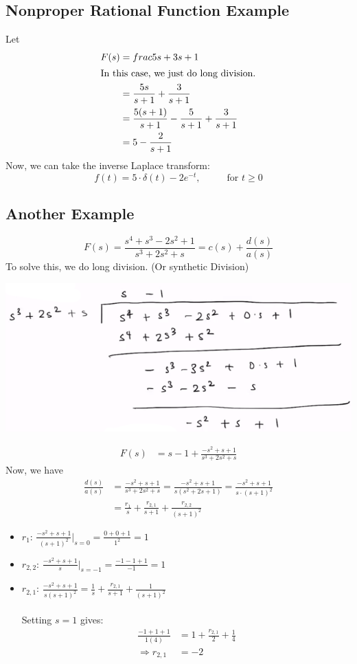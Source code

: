 \documentclass[10pt]{article}
\begin{document}
\subsection*{Nonproper Rational Function Example}
Let
\begin{align*}
    F(s) &= frac{5s + 3}{s + 1}\\
    \intertext{In this case, we just do long division.}
    &= \frac{5s}{s + 1} + \frac{3}{s + 1}\\
    &= \frac{5(s + 1)}{s + 1} - \frac{5}{s + 1} + \frac{3}{s + 1}\\
    &= 5 - \frac{2}{s + 1}
\end{align*}
Now, we can take the inverse Laplace transform:
\[f(t) = 5 \cdot \delta(t) - 2e^{-t},\hspace{1cm} \text{ for $t \geq 0$}\]

\subsection*{Another Example}
\[F(s) = \frac{s^4 + s^3 - 2s^2 + 1}{s^3 + 2s^2 + s} = c(s) + \frac{d(s)}{a(s)}\]
To solve this, we do long division.  (Or synthetic Division)
\begin{center}
    \includegraphics[scale=0.7]{W10_1.png}
\end{center}
\begin{align*}
    F(s) &= s - 1 + \frac{-s^2 + s + 1}{s^3 + 2s^2 + s}
\end{align*}
Now, we have
\begin{align*}
    \frac{d(s)}{a(s)} &= \frac{-s^2 + s + 1}{s^3 + 2s^2 + s} = \frac{-s^2 + s + 1}{s(s^2 + 2s + 1)} = \frac{-s^2 + s + 1}{s \cdot (s + 1)^2}\\
    &= \frac{r_1}{s} + \frac{r_{2, 1}}{s + 1} + \frac{r_{2, 2}}{(s + 1)^2}
\end{align*}
\begin{itemize}
    \item $r_1$: $\frac{-s^2 + s + 1}{(s + 1)^2} \bigg|_{s = 0} = \frac{0 + 0 + 1}{1^2} = 1$
    \item $r_{2, 2}$: $\frac{-s^2 + s + 1}{s}\bigg|_{s = -1} = \frac{-1 - 1 + 1}{-1} = 1$
    \item $r_{2, 1}$: $\frac{-s^2 + s + 1}{s(s + 1)^2} = \frac{1}{s} + \frac{r_{2, 1}}{s + 1} + \frac{1}{(s + 1)^2}$\\\\
    Setting $s = 1$ gives:
    \begin{align*}
        \frac{-1 + 1 + 1}{1 (4)} &= 1 + \frac{r_{2, 1}}{2} + \frac{1}{4}\\
        \Rightarrow r_{2, 1} &= -2
    \end{align*}
\end{itemize}
\end{document}
